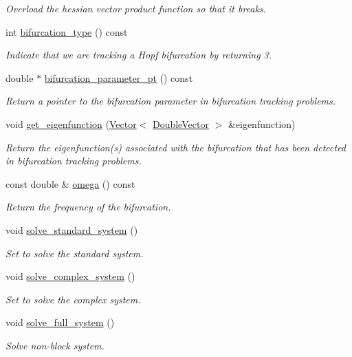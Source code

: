 \begin{DoxyCompactItemize}
\begin{DoxyCompactList}\small\item\em Overload the hessian vector product function so that it breaks. \end{DoxyCompactList}\item 
int \hyperlink{classoomph_1_1HopfHandler_a789de82e82adaac82b366bbaa7f7ce59}{bifurcation\+\_\+type} () const
\begin{DoxyCompactList}\small\item\em Indicate that we are tracking a Hopf bifurcation by returning 3. \end{DoxyCompactList}\item 
double $\ast$ \hyperlink{classoomph_1_1HopfHandler_a49f4d0a78ac46ea1412d71d3bb9cc6a1}{bifurcation\+\_\+parameter\+\_\+pt} () const
\begin{DoxyCompactList}\small\item\em Return a pointer to the bifurcation parameter in bifurcation tracking problems. \end{DoxyCompactList}\item 
void \hyperlink{classoomph_1_1HopfHandler_a9d1ee586e6274cfa0baa15f82b9fa0ae}{get\+\_\+eigenfunction} (\hyperlink{classoomph_1_1Vector}{Vector}$<$ \hyperlink{classoomph_1_1DoubleVector}{Double\+Vector} $>$ \&eigenfunction)
\begin{DoxyCompactList}\small\item\em Return the eigenfunction(s) associated with the bifurcation that has been detected in bifurcation tracking problems. \end{DoxyCompactList}\item 
const double \& \hyperlink{classoomph_1_1HopfHandler_a788a0cf74664712827f46bf26e078994}{omega} () const
\begin{DoxyCompactList}\small\item\em Return the frequency of the bifurcation. \end{DoxyCompactList}\item 
void \hyperlink{classoomph_1_1HopfHandler_acd2149152659deef1d938739222dbcf2}{solve\+\_\+standard\+\_\+system} ()
\begin{DoxyCompactList}\small\item\em Set to solve the standard system. \end{DoxyCompactList}\item 
void \hyperlink{classoomph_1_1HopfHandler_ac7feecfa644ae33b4a4a9fa8d1d993af}{solve\+\_\+complex\+\_\+system} ()
\begin{DoxyCompactList}\small\item\em Set to solve the complex system. \end{DoxyCompactList}\item 
void \hyperlink{classoomph_1_1HopfHandler_a507681043126f6bea58cc90deed16d1d}{solve\+\_\+full\+\_\+system} ()
\begin{DoxyCompactList}\small\item\em Solve non-\/block system. \end{DoxyCompactList}\end{DoxyCompactItemize}
